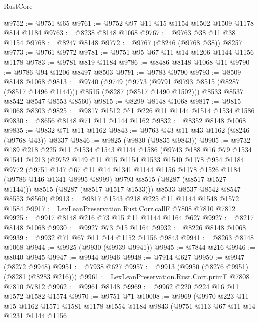 \begin{lexlean}{RustCore}
\begin{coremodule}
@9752 := @9751 @65
@9761 := @9752 @97 @11 @15 @1154 @1502 @1509 @1178 @814 @1184
@9763 := @8238 @8148 @1068
@9767 := @9763 @38 @11 @38 @1154
@9768 := @8247 @8148
@9772 := @9767 (@8246 (@9768 @38)) @8257
@9773 := @9761 @9772
@9781 := @9751 @95 @67 @11 @14 @1206 @1144 @1156 @1178
@9783 := @9781 @819 @1184
@9786 := @8486 @8148 @1068 @11
@9790 := @9786 @94 @1206 @8497 @8503
@9791 := @9783 @9790
@9793 := @8509 @8148 @1068
@9813 := @9740
    (@9749
      (@9773 (@9791 @9793 @8515 (@8287 (@8517 @1496 @1144))) @8515 (@8287 (@8517 @1490 @1502)))
      @8533
      @8537
      @8542
      @8547
      @8553
      @8560)
@9815 := @8299 @8148 @1068
@9817 := @9815 @1068 @8303
@9825 := @9817 @1512 @71 @226 @11 @1144 @1514 @1534 @1586
@9830 := @8656 @8148 @71 @11 @1144 @1162
@9832 := @8352 @8148 @1068
@9835 := @9832 @71 @11 @1162
@9843 := @9763 @43 @11 @43 @1162 (@8246 (@9768 @43)) @8337
@9846 := @9825 (@9830 (@9835 @9843))
@9905 := @9732
    @189
    @218
    @225
    @11
    @1534
    @1543
    @1144
    @1586
    (@9743
      @188
      @16
      @79
      @1534
      @1541
      @1213
      (@9752
        @149
        @11
        @15
        @1154
        @1533
        @1540
        @1178
        @954
        @1184
        @9772
        (@9751
          @147
          @67
          @11
          @14
          @1341
          @1144
          @1156
          @1178
          @1526
          @1184
          (@9786 @146 @1341 @8995 @8999)
          @9793
          @8515
          (@8287 (@8517 @1527 @1144)))
        @8515
        (@8287 (@8517 @1517 @1533)))
      @8533
      @8537
      @8542
      @8547
      @8553
      @8560)
@9913 := @9817 @1543 @218 @225 @11 @1144 @1548 @1572 @1584
@9917 := LexLeanPreservation.Rust.Corr.callF @7808 @7810 @7812
@9925 := @9917 @8148 @216 @73 @15 @11 @1144 @1164 @627
@9927 := @8217 @8148 @1068
@9930 := @9927 @73 @15 @1164
@9932 := @8226 @8148 @1068
@9939 := @9932 @71 @67 @11 @14 @1162 @1156 @9843
@9941 := @8263 @8148 @1068
@9944 := @9925 (@9930 (@9939 @9941))
@9945 := @7844 @216
@9946 := @8040 @9945
@9947 := @9944 @9946
@9948 := @7914 @627
@9950 := @9947 (@8272 @9948)
@9951 := @7938 @627
@9957 := @9913 (@9950 (@8276 @9951) (@8281 (@8283 @216)))
@9961 := LexLeanPreservation.Rust.Corr.primF @7808 @7810 @7812
@9962 := @9961 @8148
@9969 := @9962 @220 @224 @16 @11 @1572 @1582 @1574
@9970 := @9751 @71
@10008 := @9969
    (@9970
      @223
      @11
      @15
      @1162
      @1571
      @1581
      @1178
      @1554
      @1184
      @9843
      (@9751
        @113
        @67
        @11
        @14
        @1231
        @1144
        @1156

\end{coremodule}
\end{lexlean}

